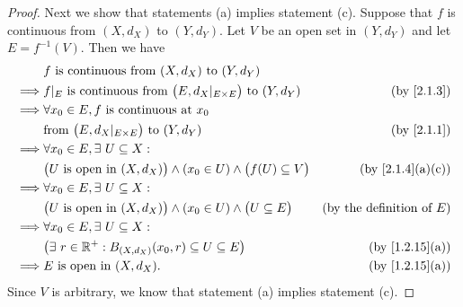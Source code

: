 \begin{proof}
  Next we show that statements (a) implies statement (c).
  Suppose that \(f\) is continuous from \((X, d_X)\) to \((Y, d_Y)\).
  Let \(V\) be an open set in \((Y, d_Y)\) and let \(E = f^{-1}(V)\).
  Then we have
  \begin{align*}
             & f \text{ is continuous from } (X, d_X) \text{ to } (Y, d_Y)                                                                       \\
    \implies & f|_{E} \text{ is continuous from } \big(E, d_X|_{E \times E}\big) \text{ to } (Y, d_Y)      & \text{(by \cref{2.1.3})}            \\
    \implies & \forall x_0 \in E, f \text{ is continuous at } x_0                                                                                \\
             & \text{from } \big(E, d_X|_{E \times E}\big) \text{ to } (Y, d_Y)                            & \text{(by \cref{2.1.1})}            \\
    \implies & \forall x_0 \in E, \exists\ U \subseteq X :                                                                                       \\
             & \big(U \text{ is open in } (X, d_X)\big) \land (x_0 \in U) \land \big(f(U) \subseteq V\big) & \text{(by \cref{2.1.4}(a)(c))}      \\
    \implies & \forall x_0 \in E, \exists\ U \subseteq X :                                                                                       \\
             & \big(U \text{ is open in } (X, d_X)\big) \land (x_0 \in U) \land \big(U \subseteq E\big)    & \text{(by the definition of \(E\))} \\
    \implies & \forall x_0 \in E, \exists\ U \subseteq X :                                                                                       \\
             & \big(\exists\ r \in \R^+ : B_{(X, d_X)}(x_0, r) \subseteq U \subseteq E\big)                & \text{(by \cref{1.2.15}(a))}        \\
    \implies & E \text{ is open in } (X, d_X).                                                             & \text{(by \cref{1.2.15}(a))}
  \end{align*}
  Since \(V\) is arbitrary, we know that statement (a) implies statement (c).


\end{proof}
